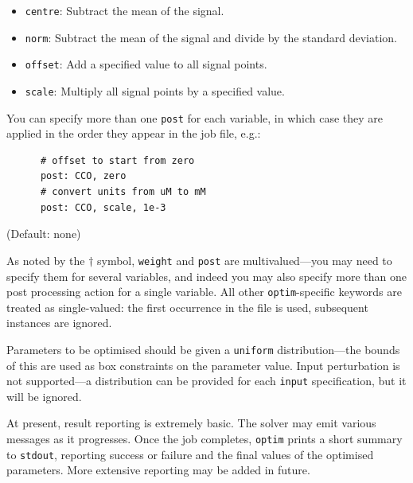 \documentclass[a4paper,11pt]{article}
\begin{document}
\begin{adjustwidth}{0.8cm}{0.8cm}
\begin{description}
\begin{itemize}
	\item \texttt{centre}: Subtract the mean of the signal.
	\item \texttt{norm}: Subtract the mean of the signal and divide by the standard deviation.
	\item \texttt{offset}: Add a specified value to all signal points.
	\item \texttt{scale}: Multiply all signal points by a specified value.
	\end{itemize}
You can specify more than one \texttt{post} for each variable, in which case they are applied in the order they appear in the job file, e.g.:
\begin{verbatim}
      # offset to start from zero
      post: CCO, zero
      # convert units from uM to mM
      post: CCO, scale, 1e-3
\end{verbatim}
(Default: none)
\end{description}
\end{adjustwidth}
As noted by the $\dagger$ symbol, \texttt{weight} and \texttt{post} are multivalued---you may need to specify them for several variables, and indeed you may also specify more than one post processing action for a single variable. All other \texttt{optim}-specific keywords are treated as single-valued: the first occurrence in the file is used, subsequent instances are ignored.

Parameters to be optimised should be given a \texttt{uniform} distribution---the bounds of this are used as box constraints on the parameter value.
Input perturbation is not supported---a distribution can be provided for each \texttt{input} specification, but it will be ignored.

At present, result reporting is extremely basic. The solver may emit various messages as it progresses. Once the job completes, \texttt{optim} prints a short summary to \texttt{stdout}, reporting success or failure and the final values of the optimised parameters. More extensive reporting may be added in future.
\end{document}
